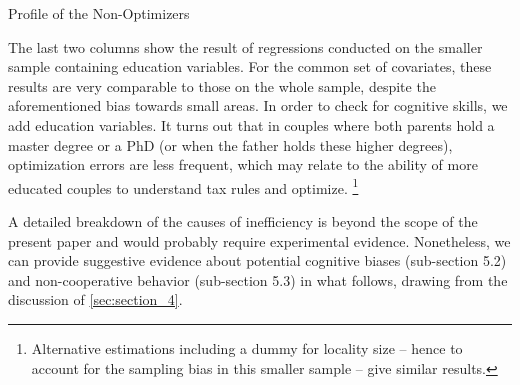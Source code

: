   \begin{table}[H]
  \caption{Profile of the Non-Optimizers}
  \label{tab:table_3}
  \end{table}

The last two columns show the result of regressions conducted on the smaller sample containing education variables. For the common set of covariates, these results are very comparable to those on the whole sample, despite the aforementioned bias towards small areas. In order to check for cognitive skills, we add education variables. It turns out that in couples where both parents hold a master degree or a PhD (or when the father holds these higher degrees), optimization errors are less frequent, which may relate to the ability of more educated couples to understand tax rules and optimize. \footnote{
    Alternative estimations including a dummy for locality size – hence to account for the sampling bias in this smaller sample – give similar results.
} 


\medskip
A detailed breakdown of the causes of inefficiency is beyond the scope of the present paper and would probably require experimental evidence. Nonetheless, we can provide suggestive evidence about potential cognitive biases (sub-section 5.2) and non-cooperative behavior (sub-section 5.3) in what follows, drawing from the discussion of \autoref{sec:section_4}.

